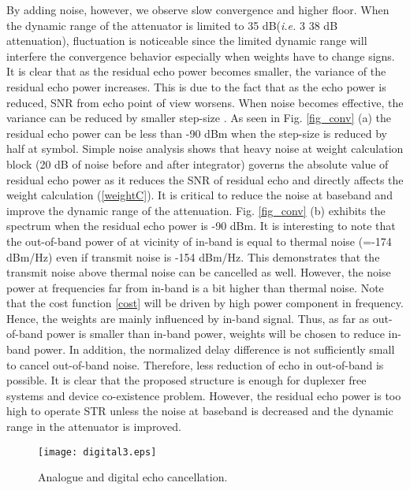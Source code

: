 \documentclass[twocolumn]{IEEEtran}
\begin{document}
By adding noise, however, we observe slow convergence and higher
floor. When the dynamic range of the attenuator is limited to 35
dB(\emph{i.e.} 3  38 dB attenuation), fluctuation is
noticeable since the limited dynamic range will interfere the
convergence behavior especially when weights have to change signs.
It is clear that as the residual echo power becomes smaller, the
variance of the residual echo power increases. This is due to the
fact that as the echo power is reduced, SNR from echo point of view
worsens. When noise becomes effective, the variance can be reduced
by smaller step-size \cite{haykin}. As seen in Fig. \ref{fig_conv}
(a) the residual echo power can be less than -90 dBm when the
step-size is reduced by half at  symbol. Simple
noise analysis shows that heavy noise at weight calculation block
(20 dB of noise before and after integrator) governs the absolute
value of residual echo power as it reduces the SNR of residual echo
and directly affects the weight calculation (\ref{weightC}). It is
critical to reduce the noise at baseband and improve the dynamic
range of the attenuation. Fig. \ref{fig_conv} (b) exhibits the
spectrum when the residual echo power is -90 dBm. It is interesting
to note that the out-of-band power of  at vicinity of in-band
is equal to thermal noise (=-174 dBm/Hz) even if transmit noise is
-154 dBm/Hz. This demonstrates that the transmit noise above thermal
noise can be cancelled as well. However, the noise power at
frequencies far from in-band is a bit higher than thermal noise.
Note that the cost function \eqref{cost} will be driven by high
power component in frequency. Hence, the weights are mainly
influenced by in-band signal. Thus, as far as out-of-band power is
smaller than in-band power, weights will be chosen to reduce in-band
power. In addition, the normalized delay difference is not
sufficiently small to cancel out-of-band noise. Therefore, less
reduction of echo in out-of-band is possible. It is clear that the
proposed structure is enough for duplexer free systems and device
co-existence problem. However, the residual echo power is too high
to operate STR unless the noise at baseband is decreased and the
dynamic range in the attenuator is improved.



\begin{figure}[!t]

\centering
    {\texttt{[image: digital3.eps]}}


\caption{Analogue and digital echo cancellation. \label{fig_digital}
}

\end{figure}
\end{document}
